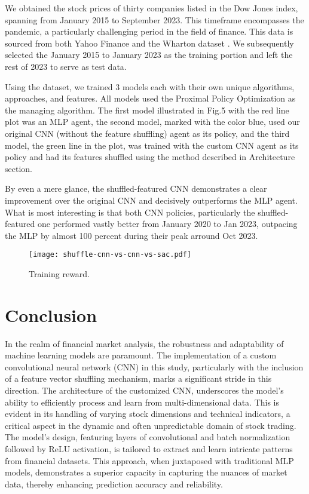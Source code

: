 {We obtained the stock prices of thirty companies listed in the Dow Jones index, spanning from January 2015 to September 2023. This timeframe encompasses the pandemic, a particularly challenging period in the field of finance. This data is sourced from both Yahoo Finance and the Wharton dataset \cite{Wharton}. We subsequently selected the January 2015 to January 2023 as the training portion and left the rest of 2023 to serve as test data.

Using the dataset, we trained 3 models each with their own unique algorithms, approaches, and features. All models used the Proximal Policy Optimization \cite{ppo2017} as the managing algorithm. The first model illustrated in Fig.5 with the red line plot was an MLP agent, the second model, marked with the color blue, used our original CNN (without the feature shuffling) agent as its policy, and the third model, the green line in the plot, was trained with the custom CNN agent as its policy and had its features shuffled using the method described in Architecture section.

By even a mere glance, the shuffled-featured CNN demonstrates a clear improvement over the original CNN and decisively outperforms the MLP agent. What is most interesting is that both CNN policies, particularly the shuffled-featured one performed vastly better from January 2020 to Jan 2023, outpacing the MLP by almost 100 percent during their peak arround Oct 2023.

\begin{figure}[htbp]
\centerline{
\texttt{[image: shuffle-cnn-vs-cnn-vs-sac.pdf]}}
\caption{Training reward.}
\label{fig:training_reward}
\end{figure}

\section{Conclusion}
In the realm of financial market analysis, the robustness and adaptability of machine learning models are paramount. The implementation of a custom convolutional neural network (CNN) in this study, particularly with the inclusion of a feature vector shuffling mechanism, marks a significant stride in this direction. The architecture of the customized CNN, underscores the model's ability to efficiently process and learn from multi-dimensional data. This is evident in its handling of varying stock dimensions and technical indicators, a critical aspect in the dynamic and often unpredictable domain of stock trading. The model's design, featuring layers of convolutional and batch normalization followed by ReLU activation, is tailored to extract and learn intricate patterns from financial datasets. This approach, when juxtaposed with traditional MLP models, demonstrates a superior capacity in capturing the nuances of market data, thereby enhancing prediction accuracy and reliability.

}
